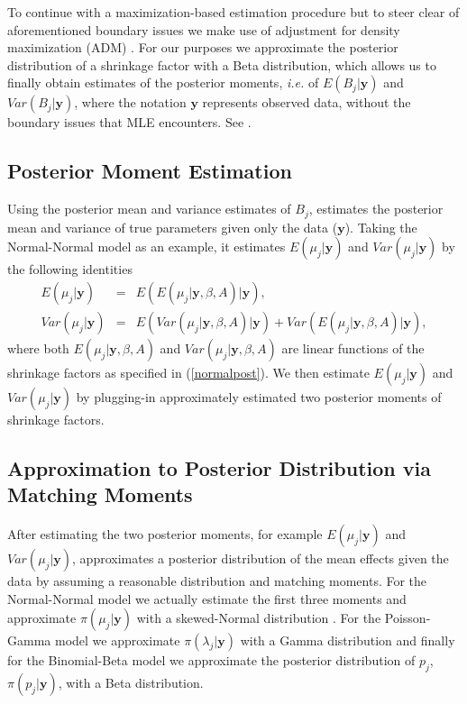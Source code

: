 \documentclass[article]{jss}
\begin{document}
To continue with a maximization-based estimation procedure but to steer clear of aforementioned boundary issues we make use of adjustment for density maximization (ADM) \citep{carl1988, 1997, 2011}. For our purposes we approximate the posterior distribution of a shrinkage factor with a Beta distribution, which allows us to finally obtain estimates of the posterior moments, \emph{i.e.}  of $E(B_{j}\vert\textbf{y})$ and $Var(B_{j}\vert\textbf{y})$, where the notation $\textbf{y}$ represents observed data, without the boundary issues that MLE encounters. See \cite{2011}.

\subsection[Posterior Moment Estimation]{Posterior Moment Estimation}

Using the posterior mean and variance estimates of $B_{j}$,  estimates the posterior mean and variance of true parameters given only the data ($\textbf{y}$). Taking the Normal-Normal model as an example, it estimates $E(\mu_{j}\vert \textbf{y})$ and $Var(\mu_{j}\vert \textbf{y})$ by the following identities
\begin{eqnarray}
E(\mu_{j}\vert \textbf{y}) & = & E(E(\mu_{j}\vert \textbf{y}, \beta, A)\vert \textbf{y}), \\
Var(\mu_{j}\vert \textbf{y}) & = & E(Var(\mu_{j}\vert \textbf{y}, \beta, A)\vert \textbf{y})+Var(E(\mu_{j}\vert \textbf{y}, \beta, A)\vert \textbf{y}),
\end{eqnarray}  
where both $E(\mu_{j}\vert \textbf{y}, \beta, A)$ and $Var(\mu_{j}\vert \textbf{y}, \beta, A)$ are linear functions of the shrinkage factors as specified in (\ref{normalpost}). We then estimate $E(\mu_{j}\vert \textbf{y})$ and $Var(\mu_{j}\vert \textbf{y})$ by plugging-in approximately estimated two posterior moments of shrinkage factors.

\subsection[Approximation to Posterior Distribution by Moment Matching]{Approximation to Posterior Distribution via Matching Moments}
After estimating the two posterior moments, for example $E(\mu_{j}\vert \textbf{y})$ and $Var(\mu_{j}\vert \textbf{y})$,  approximates a posterior distribution of the mean effects given the data by assuming a reasonable distribution and matching moments. For the Normal-Normal model we actually estimate the first three moments and approximate $\pi(\mu_{j}\vert \textbf{y})$ with a skewed-Normal distribution \citep{sn2013}. For the Poisson-Gamma model we approximate $\pi(\lambda_{j}\vert \textbf{y})$ with a Gamma distribution and finally for the Binomial-Beta model we approximate the posterior distribution of $p_{j}$, $\pi(p_{j}\vert \textbf{y})$, with a Beta distribution.
\end{document}

